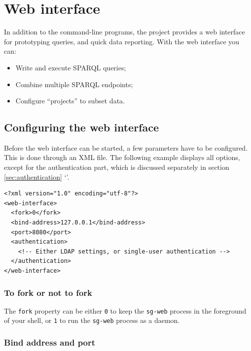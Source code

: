 \chapter{Web interface}
\label{chap:web-interface}

  In addition to the command-line programs, the project provides a web
  interface for prototyping queries, and quick data reporting.  With the
  web interface you can:
  \begin{itemize}
  \item Write and execute SPARQL queries;
  \item Combine multiple SPARQL endpoints;
  \item Configure ``projects'' to subset data.
  \end{itemize}

\section{Configuring the web interface}
\label{sec:configuring-sg-web}

  Before the web interface can be started, a few parameters have to be
  configured.  This is done through an XML file.  The following example
  displays all options, except for the authentication part, which is
  discussed separately in section \ref{sec:authentication}
  {\color{LinkGray}`'}.

\begin{siderules}
\begin{verbatim}
<?xml version="1.0" encoding="utf-8"?>
<web-interface>
  <fork>0</fork>
  <bind-address>127.0.0.1</bind-address>
  <port>8080</port>
  <authentication>
    <!-- Either LDAP settings, or single-user authentication -->
  </authentication>
</web-interface>
\end{verbatim}
\end{siderules}

\subsection{To fork or not to fork}

  The \texttt{fork} property can be either \texttt{0} to keep the
  \texttt{sg-web} process in the foreground of your shell, or
  \texttt{1} to run the \texttt{sg-web} process as a daemon.

\subsection{Bind address and port}

